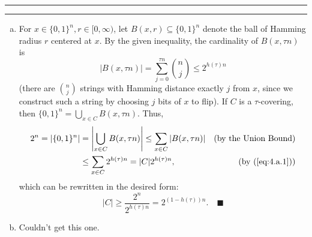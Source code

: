 \documentclass[11pt]{article}
\newcounter{questionCounter}
\newcounter{partCounter}[questionCounter]
\newenvironment{question}[2][\arabic{questionCounter}]{%
    \setcounter{partCounter}{0}%
    \vspace{.25in} \hrule \vspace{0.5em}%
        \noindent{\bf #2}%
    \vspace{0.8em} \hrule \vspace{.10in}%
    \addtocounter{questionCounter}{1}%
}{}
\newcommand{\mqed}{\quad \blacksquare}
\begin{document}
\begin{question}{Problem 4}
\begin{enumerate}[(a)]
\item For $x \in \{0,1\}^n, r \in [0,\infty)$, let $B(x,r) \subseteq \{0,1\}^n$
denote the ball of Hamming radius $r$ centered at $x$. By the given inequality,
the cardinality of $B(x,\tau n)$ is 
\begin{equation}
|B(x,\tau n)| = \sum_{j = 0}^{\tau n} {n \choose j} \leq 2^{h(\tau)n}
\label{eq:4.a.1}
\end{equation}
(there are ${n \choose j}$ strings with Hamming distance exactly $j$ from $x$,
since we construct such a string by choosing $j$ bits of $x$ to flip). If $C$
is a $\tau$-covering, then
$\{0,1\}^n = \bigcup_{x \in C} B(x, \tau n)$. Thus,
\begin{align*}
2^n = |\{0,1\}^n|
 & =    \left| \bigcup_{x \in C} B(x, \tau n) \right|
   \leq \sum_{x \in C} \left| B(x, \tau n) \right|
 & \mbox{(by the Union Bound)} \\
 & \leq \sum_{x \in C} 2^{h(\tau)n}
 =    |C| 2^{h(\tau)n},
 & \mbox{(by (\ref{eq:4.a.1}))}
\end{align*}
which can be rewritten in the desired form:
\[|C|
 \geq \frac{2^n}{2^{h(\tau)n}}
 = 2^{(1 - h(\tau))n}. \mqed
\]

\item Couldn't get this one. \frownie

\end{enumerate}
\end{question}
\end{document}
